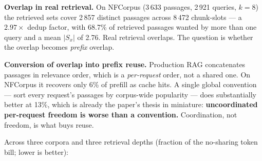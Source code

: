 \documentclass[11pt]{article}
\theoremstyle{plain}
\begin{document}
\textbf{Overlap in real retrieval.} On NFCorpus (3\,633 passages, 2\,921 queries, $k=8$) the retrieved sets cover 2\,857 distinct passages across 8\,472 chunk-slots --- a $2.97\times$ dedup factor, with 68.7\% of retrieved passages wanted by more than one query and a mean $|S_x|$ of 2.76. Real retrieval overlaps. The question is whether the overlap becomes \emph{prefix} overlap.

\textbf{Conversion of overlap into prefix reuse.} Production RAG concatenates passages in relevance order, which is a \emph{per-request} order, not a shared one. On NFCorpus it recovers only 6\% of prefill as cache hits. A single global convention --- sort every request's passages by corpus-wide popularity --- does substantially better at 13\%, which is already the paper's thesis in miniature: \textbf{uncoordinated per-request freedom is worse than a convention.} Coordination, not freedom, is what buys reuse.

Across three corpora and three retrieval depths (fraction of the no-sharing token bill; lower is better):

\begin{center}\small
{}\end{center}
\end{document}
